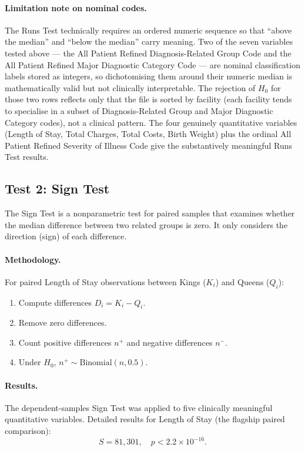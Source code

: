 \documentclass[12pt]{article}
\begin{document}
\paragraph{Limitation note on nominal codes.}
The Runs Test technically requires an ordered numeric sequence so that
``above the median'' and ``below the median'' carry meaning. Two of the
seven variables tested above --- the All Patient Refined Diagnosis-Related
Group Code and the All Patient Refined Major Diagnostic Category Code ---
are nominal classification labels stored as integers, so dichotomising
them around their numeric median is mathematically valid but not
clinically interpretable. The rejection of $H_0$ for those two rows
reflects only that the file is sorted by facility (each facility tends
to specialise in a subset of Diagnosis-Related Group and Major
Diagnostic Category codes), not a clinical pattern. The four genuinely
quantitative variables (Length of Stay, Total Charges, Total Costs,
Birth Weight) plus the ordinal All Patient Refined Severity of Illness
Code give the substantively meaningful Runs Test results.

\subsection{Test 2: Sign Test}

The Sign Test is a nonparametric test for paired samples that examines
whether the median difference between two related groups is zero. It
only considers the direction (sign) of each difference.

\paragraph{Methodology.} For paired Length of Stay observations between
Kings ($K_i$) and Queens ($Q_i$):
\begin{enumerate}[nosep]
    \item Compute differences $D_i = K_i - Q_i$.
    \item Remove zero differences.
    \item Count positive differences $n^+$ and negative differences $n^-$.
    \item Under $H_0$, $n^+ \sim \text{Binomial}(n, 0.5)$.
\end{enumerate}

\paragraph{Results.}
The dependent-samples Sign Test was applied to five clinically
meaningful quantitative variables. Detailed results for Length of Stay
(the flagship paired comparison):
\[
S = 81{,}301, \quad p < 2.2 \times 10^{-16}.
\]
\end{document}
